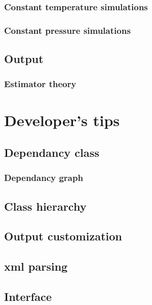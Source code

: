 \documentclass[12pt,fleqn]{report}
\begin{document}
\subsection{Constant temperature simulations}
\subsection{Constant pressure simulations}
\section{Output}
\subsection{Estimator theory}

\chapter{Developer's tips}
\section{Dependancy class}
\subsection{Dependancy graph}
\section{Class hierarchy}
\section{Output customization}
\section{xml parsing}
\section{Interface}

\begin{thebibliography}{99}
\end{thebibliography}
\end{document}
